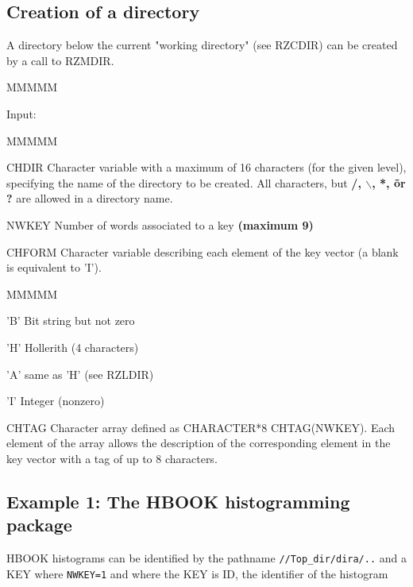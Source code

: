 \subsection{Creation of a directory}
\par A directory below the current "working directory" (see RZCDIR)
can be created by a call to RZMDIR.
\begin{DL}{MMMMM}
\item[Input:
]
\begin{DL}{MMMMM}
\item[CHDIR
]Character variable with a maximum of 16 characters (for the given
level), specifying the name of the directory to be
created. All characters, but {\bf /, $\backslash$, *, \~ or ?}
are allowed in a directory name.
\item[NWKEY
]Number of words associated to a key {\bf (maximum 9)}
\item[CHFORM
]Character variable describing each element of the key vector
(a blank is equivalent to 'I').
\begin{DL}{MMMMM}
\item['B'
]Bit string but not zero
\item['H'
]Hollerith (4 characters)
\item['A'
]same as 'H' (see RZLDIR)
\item['I'
]Integer (nonzero)
\end{DL}
\item[CHTAG
]Character array defined as CHARACTER*8 CHTAG(NWKEY).
\newline
Each element of the array allows the description of the corresponding
element in the key vector with a tag of up to 8 characters.
\end{DL}
\end{DL}
\subsection{Example 1: The HBOOK histogramming package}
\par HBOOK histograms can be identified by the pathname
{\tt //Top_dir/dira/..}
and a KEY where {\tt NWKEY=1}
and where the KEY is ID, the identifier
of the histogram
